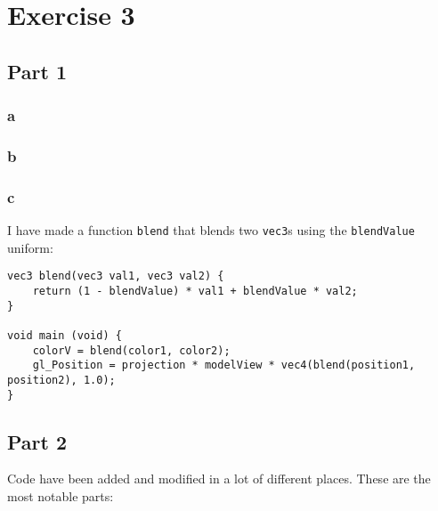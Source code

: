 \section{Exercise 3}

\subsection{Part 1}

\subsubsection{a}

\subsubsection{b}

\subsubsection{c}
I have made a function \texttt{blend} that blends two \texttt{vec3}s using the \texttt{blendValue} uniform:

\begin{lstlisting}
vec3 blend(vec3 val1, vec3 val2) {
	return (1 - blendValue) * val1 + blendValue * val2;
}

void main (void) {
    colorV = blend(color1, color2);
    gl_Position = projection * modelView * vec4(blend(position1, position2), 1.0);
}
\end{lstlisting}


\subsection{Part 2}
Code have been added and modified in a lot of different places. These are the most notable parts:

